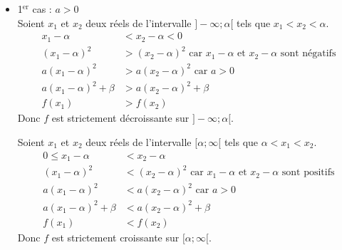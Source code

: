 \documentclass[11pt,a4paper]{article}
\begin{document}
\begin{itemize}
    \item 1$^{\text{er}}$ cas : $a>0$ ~\\
        Soient $x_1$ et $x_2$ deux réels de l'intervalle $]-\infty;\alpha[$ tels que $x_1<x_2<\alpha$.
        \begin{align*}
            x_1-\alpha            & <  x_2-\alpha < 0                                                                    \\
            (x_1-\alpha)^2        & >  (x_2-\alpha)^2 \text{ car }x_1-\alpha \text{ et }x_2-\alpha \text{ sont négatifs} \\
            a(x_1-\alpha)^2       & > a(x_2-\alpha)^2 \text{ car } a>0                                                   \\
            a(x_1-\alpha)^2+\beta & > a(x_2-\alpha)^2+\beta                                                              \\
            f(x_1)                & > f(x_2)
        \end{align*}
        Donc $f$ est strictement décroissante sur $]-\infty;\alpha[$.

        Soient $x_1$ et $x_2$ deux réels de l'intervalle $[\alpha;\infty[$ tels que $\alpha<x_1<x_2$.
        \begin{align*}
            0\leq x_1-\alpha      & <  x_2-\alpha                                                                        \\
            (x_1-\alpha)^2        & <  (x_2-\alpha)^2 \text{ car }x_1-\alpha \text{ et }x_2-\alpha \text{ sont positifs} \\
            a(x_1-\alpha)^2       & < a(x_2-\alpha)^2 \text{ car } a>0                                                   \\
            a(x_1-\alpha)^2+\beta & < a(x_2-\alpha)^2+\beta                                                              \\
            f(x_1)                & < f(x_2)
        \end{align*}
        Donc $f$ est strictement croissante sur $[\alpha;\infty[$.


\end{itemize}
\end{document}
